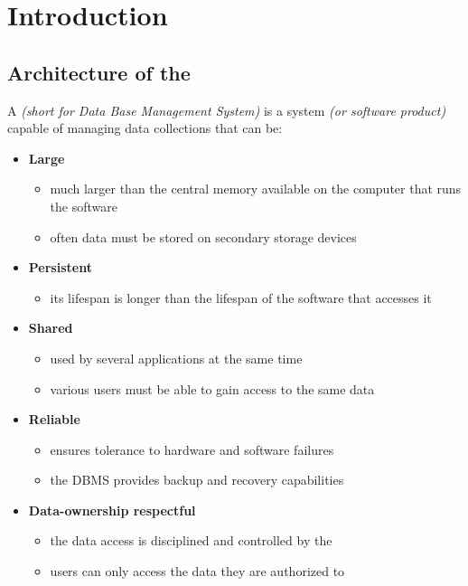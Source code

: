 \documentclass[english]{article}
\begin{document}

\section{Introduction}

\subsection{Architecture of the \DBMS}

A \textbf{\DBMS} \textit{(short for Data Base Management System)} is a system \textit{(or software product)} capable of managing data collections that can be:

\begin{itemize}
  \item \textbf{Large}
        \begin{itemize}[label=\(\rightarrow\)]
          \item much larger than the central memory available on the computer that runs the software
          \item often data must be stored on secondary storage devices
        \end{itemize}
  \item \textbf{Persistent}
        \begin{itemize}[label=\(\rightarrow\)]
          \item its lifespan is longer than the lifespan of the software that accesses it
        \end{itemize}
  \item \textbf{Shared}
        \begin{itemize}[label=\(\rightarrow\)]
          \item used by several applications at the same time
          \item various users must be able to gain access to the same data
        \end{itemize}
  \item \textbf{Reliable}
        \begin{itemize}[label=\(\rightarrow\)]
          \item ensures tolerance to hardware and software failures
          \item the DBMS provides backup and recovery capabilities
        \end{itemize}
  \item \textbf{Data-ownership respectful}
        \begin{itemize}[label=\(\rightarrow\)]
          \item the data access is disciplined and controlled by the \DBMS
          \item users can only access the data they are authorized to
        \end{itemize}
\end{itemize}
\end{document}
